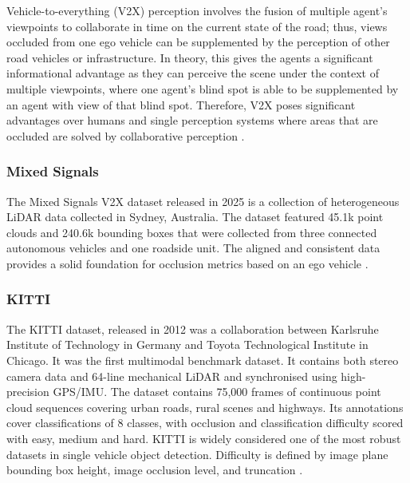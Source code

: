 \documentclass[12pt,a4paper]{article}
\begin{document}
Vehicle-to-everything (V2X) perception involves the fusion of multiple
agent's viewpoints to collaborate in time on the current state of the
road; thus, views occluded from one ego vehicle can be supplemented by
the perception of other road vehicles or infrastructure. In theory, this
gives the agents a significant informational advantage as they can
perceive the scene under the context of multiple viewpoints, where one
agent's blind spot is able to be supplemented by an agent with view of
that blind spot. Therefore, V2X poses significant advantages over humans
and single perception systems where areas that are occluded are solved
by collaborative perception \cite{bib_ref_11}.

\subsubsection{Mixed Signals}

The Mixed Signals V2X dataset released in 2025 is a collection of
heterogeneous LiDAR data collected in Sydney, Australia. The dataset
featured 45.1k point clouds and 240.6k bounding boxes that were
collected from three connected autonomous vehicles and one roadside
unit. The aligned and consistent data provides a solid foundation for
occlusion metrics based on an ego vehicle
\cite{bib_ref_12}.

\subsubsection{KITTI}

The KITTI dataset, released in 2012 was a collaboration between
Karlsruhe Institute of Technology in Germany and Toyota Technological
Institute in Chicago. It was the first multimodal benchmark dataset. It
contains both stereo camera data and 64-line mechanical LiDAR and
synchronised using high-precision GPS/IMU. The dataset contains 75,000
frames of continuous point cloud sequences covering urban roads, rural
scenes and highways. Its annotations cover classifications of 8 classes,
with occlusion and classification difficulty scored with easy, medium and
hard. KITTI is widely considered one of the most robust datasets in
single vehicle object detection. Difficulty is defined by image plane
bounding box height, image occlusion level, and truncation
\cite{bib_ref_13,bib_ref_14}.
\end{document}
